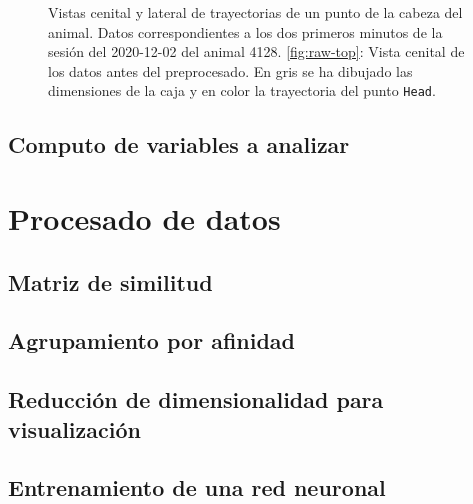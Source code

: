 \begin{figure}[H]
\begin{subfigure}{0.45\textwidth}
    \caption{}
  \end{subfigure}
  \caption[Trayectorias durante el preprocesado]{Vistas cenital y lateral de trayectorias de un punto de la cabeza del animal. Datos correspondientes a los dos primeros minutos de la sesión del 2020-12-02 del animal 4128. \ref{fig:raw-top}: Vista cenital de los datos antes del preprocesado. En gris se ha dibujado las dimensiones de la caja y en color la trayectoria del punto \texttt{Head}.}
  \label{fig:raw-trayectories}
\end{figure}


\subsection{Computo de variables a analizar}

\newpage
\section{Procesado de datos}

\subsection{Matriz de similitud}

\subsection{Agrupamiento por afinidad}

\subsection{Reducción de dimensionalidad para visualización}

\subsection{Entrenamiento de una red neuronal}
